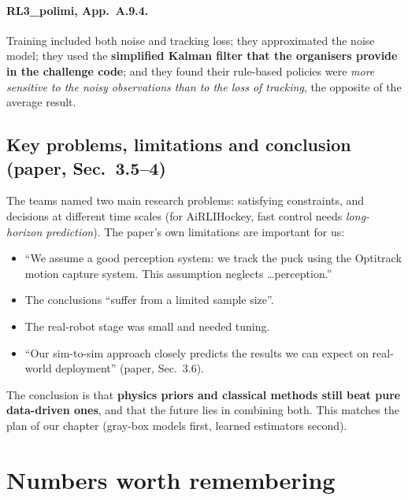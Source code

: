 \documentclass[11pt,a4paper]{article}
\begin{document}
\paragraph{RL3\_polimi, App.~A.9.4.}
Training included both noise and tracking loss; they approximated the noise model; they used the
\textbf{simplified Kalman filter that the organisers provide in the challenge code}; and they
found their rule-based policies were \emph{more sensitive to the noisy observations than to the
loss of tracking}, the opposite of the average result.

\subsection{Key problems, limitations and conclusion (paper, Sec.~3.5--4)}
The teams named two main research problems: satisfying constraints, and decisions at different
time scales (for AiRLIHockey, fast control needs \emph{long-horizon prediction}). The paper's own
limitations are important for us:
\begin{itemize}
\item ``We assume a good perception system: we track the puck using the Optitrack motion capture
system. This assumption neglects \ldots perception.''
\item The conclusions ``suffer from a limited sample size''.
\item The real-robot stage was small and needed tuning.
\item ``Our sim-to-sim approach closely predicts the results we can expect on real-world
deployment'' (paper, Sec.~3.6).
\end{itemize}
The conclusion is that \textbf{physics priors and classical methods still beat pure data-driven
ones}, and that the future lies in combining both. This matches the plan of our chapter
(gray-box models first, learned estimators second).

\section{Numbers worth remembering}
\end{document}
